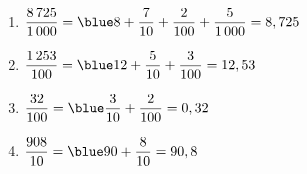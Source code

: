    \ \\ [-5mm]
   \begin{enumerate}
      \item $\dfrac{8\,725}{1\,000} =\blue 8+\dfrac{7}{10}+\dfrac{2}{100}+\dfrac{5}{1\,000} =8,725$ \medskip
      \item $\dfrac{1\,253}{100} =\blue 12+\dfrac{5}{10}+\dfrac{3}{100} =12,53$ \medskip
      \item $\dfrac{32}{100} =\blue \dfrac{3}{10}+\dfrac{2}{100} =0,32$ \medskip
      \item $\dfrac{908}{10} =\blue 90+\dfrac{8}{10} =90,8$
   \end{enumerate}
